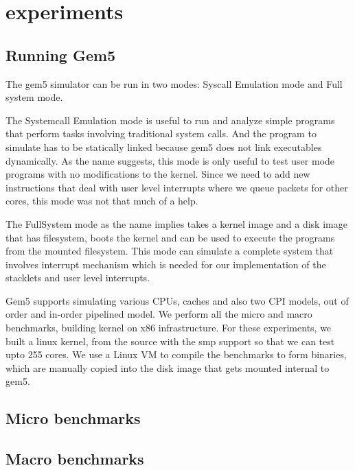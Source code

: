 \section{experiments}

\subsection{Running Gem5}
The gem5 simulator can be run in two modes: Syscall Emulation mode and
Full system mode.

The Systemcall Emulation mode is useful to run and analyze simple programs that
perform tasks involving traditional system calls. And the program to simulate
has to be statically linked because gem5 does not link executables dynamically.
As the name suggests, this mode is only useful to test user mode programs with
no modifications to the kernel. Since we need to add new instructions that deal
with user level interrupts where we queue packets for other cores, this mode
was not that much of a help.

The FullSystem mode as the name implies takes a kernel image and a disk image
that has filesystem, boots the kernel and can be used to execute the programs
from the mounted filesystem. This mode can simulate a complete system that 
involves interrupt mechanism which is needed for our implementation of the
stacklets and user level interrupts. 

Gem5 supports simulating various CPUs, caches and also two CPI models,
out of order and in-order pipelined model. We perform all the micro and macro 
benchmarks, building kernel on x86 infrastructure. For these experiments, we 
built a linux kernel, from the source with the smp support so that we can test 
upto 255 cores. We use a Linux VM to compile the benchmarks to form binaries, 
which are manually copied into the disk image that gets mounted internal to 
gem5.

\subsection{Micro benchmarks}






\subsection{Macro benchmarks}

